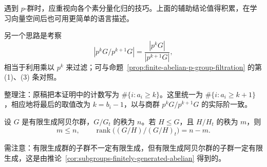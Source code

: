 \begin{purplenote}
遇到 $p$-群时，应重视向各个素分量化归的技巧。上面的辅助结论值得积累，在学习向量空间后也可用更简单的语言描述。

另一个思路是考察
\[
  \left|p^kG/p^{k+1}G\right|
  =\frac{|p^kG|}{|p^{k+1}G|},
\]
相当于利用乘以 $p^k$ 来过滤；可与命题~\ref{prop:finite-abelian-p-group-filtration} 的第 (1)、(3) 条对照。

整理注：原稿把本证明中的计数写为 $\#\{i:a_i\geq k\}$。这里统一为 $\#\{i:a_i\geq k+1\}$，相应地将最后的取值改为 $k=b_i-1$，以与商群 $p^kG/p^{k+1}G$ 的实际阶一致。
\end{purplenote}

\begin{theorem}\label{thm:fg-abelian-rank-quotient}
设 $G$ 是有限生成阿贝尔群，$G/G_t$ 的秩为 $n$。若 $H\leq G$，且 $H/H_t$ 的秩为 $m$，则
\[
  m\leq n,\qquad
  \operatorname{rank}\bigl((G/H)/(G/H)_t\bigr)=n-m.
\]
\end{theorem}

\begin{purplenote}
需注意：有限生成群的子群不一定有限生成，但有限生成阿贝尔群的子群一定有限生成，这是由推论~\ref{cor:subgroups-finitely-generated-abelian} 得到的。
\end{purplenote}

